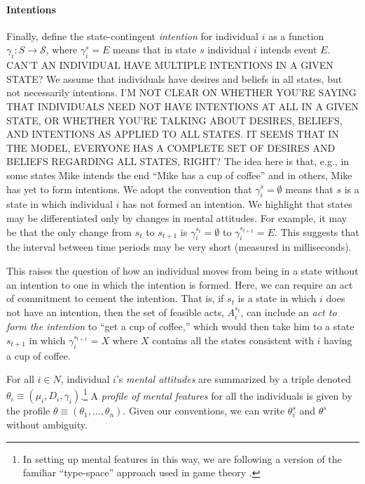 \documentclass[
11pt,
titlepage,
reqno,
]{article}%
\theoremstyle{definition}
\begin{document}
	\paragraph*{Intentions \label{para: intentions}}
	Finally, define the state-contingent \textit{intention} for individual $i$ as a function $\gamma_i:S\rightarrow \mathcal{S}$, where $\gamma_i^s=E$ means that in state $s$ individual $i$ intends event $E$. 
	CAN'T AN INDIVIDUAL HAVE MULTIPLE INTENTIONS IN A GIVEN STATE?
	We assume that individuals have desires and beliefs in all states, but not necessarily intentions. 
	I'M NOT CLEAR ON WHETHER YOU'RE SAYING THAT INDIVIDUALS NEED NOT HAVE INTENTIONS AT ALL IN A GIVEN STATE, OR WHETHER YOU'RE TALKING ABOUT DESIRES, BELIEFS, AND INTENTIONS AS APPLIED TO ALL STATES. IT SEEMS THAT IN THE MODEL, EVERYONE HAS A COMPLETE SET OF DESIRES AND BELIEFS REGARDING ALL STATES, RIGHT?
	The idea here is that, e.g., in some states Mike intends the end ``Mike has a cup of coffee'' and in others, Mike has yet to form intentions.
	We adopt the convention that $\gamma_i^s=\emptyset$ means that $s$ is a state in which individual $i$ has not formed an intention. 
	We highlight that states may be differentiated only by changes in mental attitudes. 
	For example, it may be that the only change from $s_t$ to $s_{t+1}$ is $\gamma_i^{s_t}=\emptyset$ to $\gamma_i^{s_{t+1}}=E$.
	This suggests that the interval between time periods may be very short (measured in milliseconds).
	
	This raises the question of how an individual moves from being in a state without an intention to one in which the intention is formed. 
	Here, we can require an act of commitment to cement the intention. 
	That is, if $s_t$ is a state in which $i$ does not have an intention, then the set of feasible acts, $A^{s_t}_i$, can include an \textit{act to form the intention} to ``get a cup of coffee,'' which would then take him to a state $s_{t+1}$ in which $\gamma_i^{s_{t+1}}=X$ where $X$ contains all the states consistent with $i$ having a cup of coffee.
	
	For all $i\in N$, individual $i$'s \textit{mental attitudes} are summarized by a triple denoted $\theta_i\equiv(\mu_i,D_i,\gamma_i)$.\footnote
	{
		In setting up mental features in this way, we are following a version of the familiar ``type-space'' approach used in game theory \citep[See][]{Harsanyi1967, Mertens1985a}. 
	} 
	A \textit{profile of mental features} for all the individuals is given by the profile $\theta\equiv(\theta_1,\ldots,\theta_n)$. 
	Given our conventions, we can write $\theta_i^s$ and $\theta^s$ without ambiguity.
	
\end{document}
